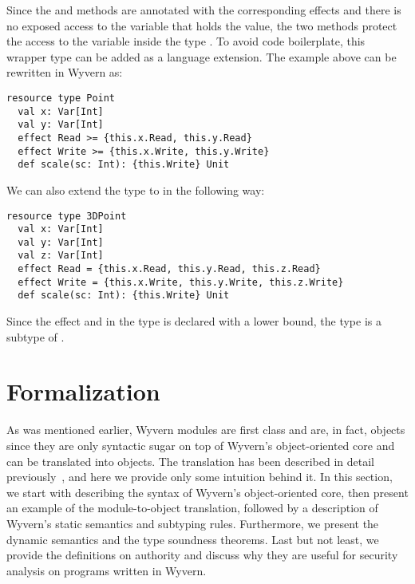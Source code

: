Since the  and  methods are annotated with the corresponding effects and there is no exposed access to the variable that holds the value, the two methods protect the access to the variable inside the type . To avoid code boilerplate, this wrapper type can be added as a language extension. The  example above can be rewritten in Wyvern as:
\begin{lstlisting}[numbers=none]
resource type Point
  val x: Var[Int]
  val y: Var[Int]
  effect Read >= {this.x.Read, this.y.Read}
  effect Write >= {this.x.Write, this.y.Write}
  def scale(sc: Int): {this.Write} Unit
\end{lstlisting}

We can also extend the type  to  in the following way:
\begin{lstlisting}[numbers=none]
resource type 3DPoint
  val x: Var[Int]
  val y: Var[Int]
  val z: Var[Int]
  effect Read = {this.x.Read, this.y.Read, this.z.Read}
  effect Write = {this.x.Write, this.y.Write, this.z.Write}
  def scale(sc: Int): {this.Write} Unit
\end{lstlisting}
Since the effect  and  in the type  is declared with a lower bound, the type  is a subtype of .








\section{Formalization}
\label{sec-form}

As was mentioned earlier, Wyvern modules are first class and are, in fact, objects since they are only syntactic sugar on top of Wyvern's object-oriented core and can be translated into objects. The translation has been described in detail previously~\cite{melicher17}, and here we provide only some intuition behind it. In this section, we start with describing the syntax of Wyvern's object-oriented core, then present an example of the module-to-object translation, followed by a description of Wyvern's static semantics and subtyping rules.  Furthermore, we present the dynamic semantics and the type soundness theorems. Last but not least, we provide the definitions on authority and discuss why they are useful for security analysis on programs written in Wyvern.



